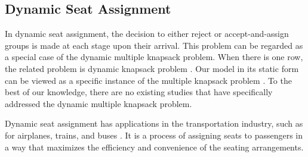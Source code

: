 




\subsection{Dynamic Seat Assignment}
In dynamic seat assignment, the decision to either reject or accept-and-assign groups is made at each stage upon their arrival. This problem can be regarded as a special case of the dynamic multiple knapsack problem. When there is one row, the related problem is dynamic knapsack problem \cite{kleywegt1998dynamic}. Our model in its static form can be viewed as a specific instance of the multiple knapsack problem \cite{pisinger1999exact}. To the best of our knowledge, there are no existing studies that have specifically addressed the dynamic multiple knapsack problem.

Dynamic seat assignment has applications in the transportation industry, such as for airplanes, trains, and buses \cite{hamdouch2011schedule, berge1993demand, zhu2023assign}. It is a process of assigning seats to passengers in a way that maximizes the efficiency and convenience of the seating arrangements.

